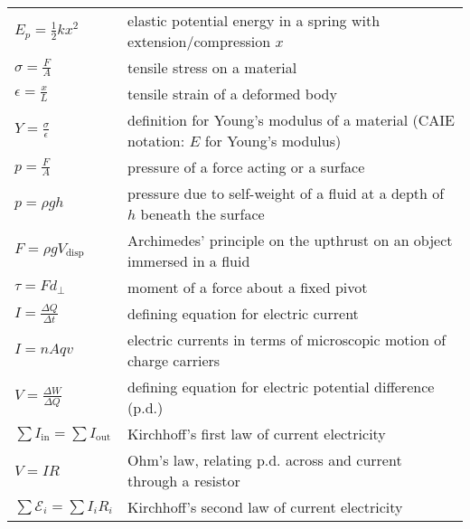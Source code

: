 {{\begin{longtable}{p{} p{}}
$E_p = \frac{1}{2}kx^2$ & elastic potential energy in a spring with extension/compression $x$ \\

$\sigma = \frac{F}{A}$ & tensile stress on a material \\

$\epsilon = \frac{x}{L}$ & tensile strain of a deformed body \\

$Y = \frac{\sigma}{\epsilon}$ & definition for Young's modulus of a material (CAIE notation: $E$ for Young's modulus) \\

$p=\frac{F}{A}$ & pressure of a force acting or a surface \\

$p=\rho g h$ & pressure due to self-weight of a fluid at a depth of $h$ beneath the surface \\

$F = \rho g V_\text{disp}$ & Archimedes' principle on the upthrust on an object immersed in a fluid \\

$\tau = F d_\perp$ & moment of a force about a fixed pivot \\



$I = \frac{\Delta Q}{\Delta t}$ & defining equation for electric current \\

$I = nAqv$ & electric currents in terms of microscopic motion of charge carriers \\

$V = \frac{\Delta W}{\Delta Q}$ & defining equation for electric potential difference (p.d.) \\

$\sum I_\text{in} = \sum I_\text{out}$ & Kirchhoff's first law of current electricity \\

$V=IR$ & Ohm's law, relating p.d. across and current through a resistor \\

$\sum \mathcal{E}_i = \sum I_i R_i$ & Kirchhoff's second law of current electricity \\


\end{longtable}}}
